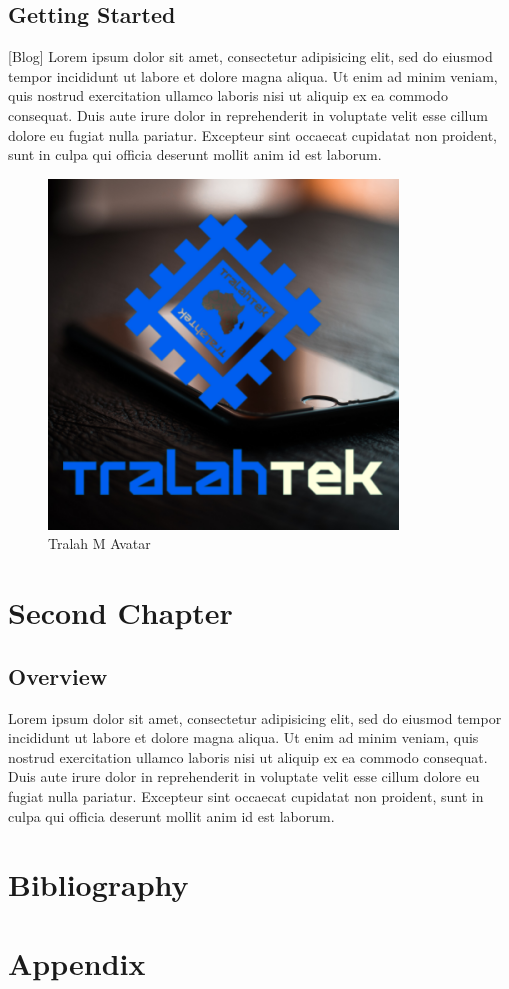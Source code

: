 \documentclass[]{article}
\begin{document}
\subsection{Getting Started}
\href{https://tralahm.tralahtek.com}[Blog]
\cite{Tralahtek}
Lorem ipsum dolor sit amet, consectetur adipisicing elit, sed do eiusmod tempor incididunt ut labore et dolore magna aliqua. Ut enim ad minim veniam, quis nostrud exercitation ullamco laboris nisi ut aliquip ex ea commodo consequat. Duis aute irure dolor in reprehenderit in voluptate velit esse cillum dolore eu fugiat nulla pariatur. Excepteur sint occaecat cupidatat non proident, sunt in culpa qui officia deserunt mollit anim id est laborum.
\begin{figure}[h]
    \includegraphics[width=0.5\linewidth,inner]{logo.png}
    \caption{Tralah M Avatar}
    \label{fig:figure1}
\end{figure}

\newpage


\section{Second Chapter}
\subsection{Overview}
Lorem ipsum dolor sit amet, consectetur adipisicing elit, sed do eiusmod tempor incididunt ut labore et dolore magna aliqua. Ut enim ad minim veniam, quis nostrud exercitation ullamco laboris nisi ut aliquip ex ea commodo consequat. Duis aute irure dolor in reprehenderit in voluptate velit esse cillum dolore eu fugiat nulla pariatur. Excepteur sint occaecat cupidatat non proident, sunt in culpa qui officia deserunt mollit anim id est laborum.

\newpage

\section{Bibliography}
\printbibliography

\newpage

\section{Appendix}
\begin{appendix}
    \listoffigures
    \listoftables
\end{appendix}
\end{document}
